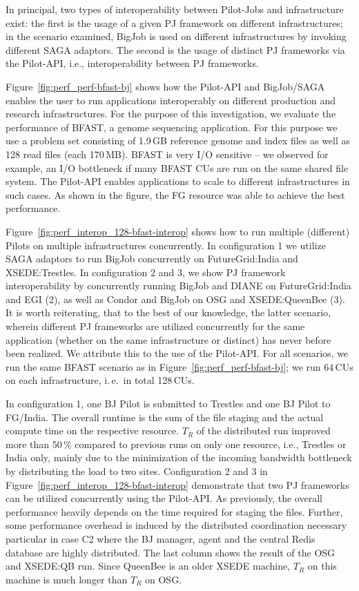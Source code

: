 \documentclass[]{paper}
\begin{document}
In principal, two types of interoperability between Pilot-Jobs and
infrastructure exist: the first is the usage of a given PJ framework on
different infrastructures; in the scenario examined, BigJob is used on
different infrastructures by invoking different SAGA adaptors. The second is
the usage of distinct PJ frameworks via the Pilot-API, i.e., interoperability
between PJ frameworks. 


Figure~\ref{fig:perf_perf-bfast-bj} shows how the Pilot-API and BigJob/SAGA
enables the user to run applications interoperably on different production and
research infrastructures. For the purpose of this
investigation, we evaluate the performance of BFAST, a genome sequencing
application. For this purpose we use a problem set consisting of 1.9\,GB
reference genome and index files as well as 128 read files (each 170\,MB).
BFAST is very I/O sensitive -- we observed for example, an I/O bottleneck if
many BFAST CUs are run on the same shared file system. The Pilot-API enables
applications to scale to different infrastructures in such cases. As shown in
the figure, the FG resource was able to achieve the best performance.


Figure~\ref{fig:perf_interop_128-bfast-interop} shows how to run multiple
(different) Pilots on multiple infrastructures concurrently. In configuration
1 we utilize SAGA adaptors to run BigJob concurrently on FutureGrid:India and
XSEDE:Trestles. In configuration 2 and 3, we show PJ framework
interoperability by concurrently running BigJob and DIANE on FutureGrid:India
and EGI (2), as well as Condor and BigJob on OSG and XSEDE:QueenBee (3). It is
worth reiterating, that to the best of our knowledge, the latter scenario,
wherein different PJ frameworks are utilized concurrently for the same
application (whether on the same infrastructure or distinct) has never before
been realized. We attribute this to the use of the Pilot-API. For all
scenarios, we run the same BFAST scenario as in
Figure~\ref{fig:perf_perf-bfast-bj}; we run 64\,CUs on each infrastructure,
i.\,e.\ in total 128\,CUs.

In configuration 1, one BJ Pilot is submitted to Trestles and one BJ Pilot to
FG/India. The overall runtime is the sum of the file staging and the actual
compute time on the respective resource. $T_R$ of the distributed run improved
more than 50\,\% compared to previous runs on only one resource, i.e.,
Trestles or India only, mainly due to the minimization of the incoming
bandwidth bottleneck by distributing the load to two sites. Configuration 2
and 3 in Figure~\ref{fig:perf_interop_128-bfast-interop} demonstrate that two
PJ frameworks can be utilized concurrently using the Pilot-API. As previously,
the overall performance heavily depends on the time required for staging the
files. Further, some performance overhead is induced by the distributed
coordination necessary particular in case C2 where the BJ manager, agent and
the central Redis database are highly distributed. The last column shows the
result of the OSG and XSEDE:QB run. Since QueenBee is an older XSEDE machine,
$T_R$ on this machine is much longer than $T_R$ on OSG.
\end{document}
